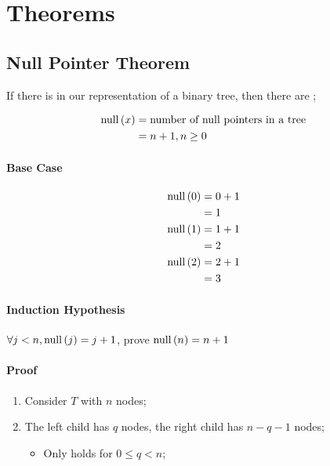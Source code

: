 \section{Theorems}

\subsection{Null Pointer Theorem}
  
  \begin{theorem}
    If there is  in our representation of a binary tree,
    then there are ;
  \end{theorem}

  \begin{align*}
    \operatorname{null} \left( x \right) &= \text{number of null pointers in a tree} \\ 
    &= n + 1, n \geq 0
  \end{align*}
  
  \paragraph{Base Case}
  \begin{align*}
    \operatorname{null} \left( 0 \right) &= 0 + 1 \\ 
    &= 1 \\ 
    \operatorname{null} \left( 1 \right) &= 1 + 1 \\ 
    &= 2 \\ 
    \operatorname{null} \left( 2 \right) &= 2 + 1 \\ 
    &= 3 \\ 
  \end{align*}
  
  \paragraph{Induction Hypothesis}
  $ \forall j < n, \operatorname{null} \left( j \right) = j + 1 $, prove 
  $ \operatorname{null} \left( n \right) = n + 1 $
  
  \paragraph{Proof}
  \begin{enumerate}
    \item Consider $ T $ with $ n $ nodes;
    \item The left child has $ q $ nodes, the right child has $ n - q - 1 $ nodes;
    \begin{itemize}
      \item Only holds for $ 0 \leq q < n $;
    \end{itemize}
  \end{enumerate}

